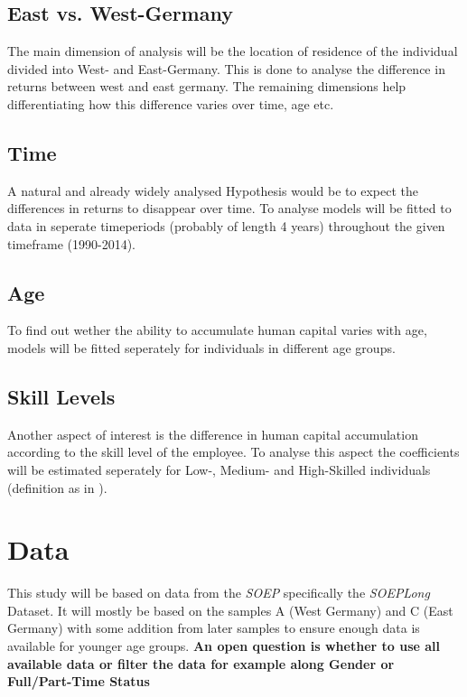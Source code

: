 \documentclass{article}
\begin{document}
\subsection{East vs. West-Germany}
The main dimension of analysis will be the location of residence of the individual divided into West- and East-Germany. This is done to analyse the difference in returns between west and east germany. The remaining dimensions help differentiating how this difference varies over time, age etc.
\subsection{Time}
A natural and already widely analysed Hypothesis would be to expect the differences in returns to disappear over time. To analyse models will be fitted to data in seperate timeperiods (probably of length 4 years) throughout the given timeframe (1990-2014).
\subsection{Age}
To find out wether the ability to accumulate human capital varies with age, models will be fitted seperately for individuals in different age groups.
\subsection{Skill Levels}
Another aspect of interest is the difference in human capital accumulation according to the skill level of the employee. To analyse this aspect the coefficients will be estimated seperately for Low-, Medium- and High-Skilled individuals (definition as in \cite{orlowski_east_2009}).
\section{Data}
This study will be based on data from the \textit{SOEP} specifically the \textit{SOEPLong} Dataset. It will mostly be based on the samples A (West Germany) and C (East Germany) with some addition from later samples to ensure enough data is available for younger age groups.
\textbf{An open question is whether to use all available data or filter the data for example along Gender or Full/Part-Time Status}
\end{document}
